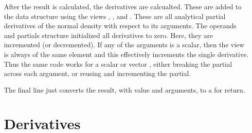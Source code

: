 \documentclass[10pt]{article}
\begin{document}
After the result is calculated, the derivatives are calcualted.  These
are added to the  data structure using the
views , , and .  These are
all analytical partial derivatives of the normal density with respect
to its arguments.  The operands and partials structure initialized all
derivatives to zero.  Here, they are incremented (or decremented).  If
any of the arguments is a scalar, then the view is always of the same
element and this effectively increments the single derivative.  Thus
the same code works for a scalar or vector , either
breaking the partial across each argument, or reusing  and
incrementing the partial.

The final line just converts the result, with value and arguments, to
a  for return.












\clearpage
\appendix

\section{Derivatives}\label{derivative-definitions.section}
\end{document}
